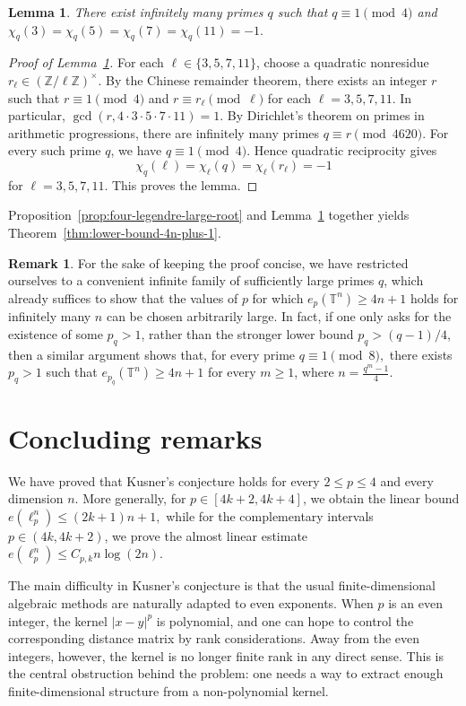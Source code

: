 \documentclass[11pt]{article}
\newtheorem{lemma}[theorem]{Lemma}
\theoremstyle{definition}
\newtheorem{rmk}[theorem]{Remark}
\newcommand{\T}{\mathbb T}
\begin{document}
\begin{lemma}\label{lem:infinitely-many-q-4n}
There exist infinitely many primes \(q\) such that
\(
q\equiv1\pmod4\)
and
\(
\chi_q(3)=\chi_q(5)=\chi_q(7)=\chi_q(11)=-1.
\)
\end{lemma}
\begin{proof}[Proof of Lemma~\ref{lem:infinitely-many-q-4n}]
    For each \(\ell\in\{3,5,7,11\}\), choose a quadratic nonresidue
\(
r_\ell\in(\mathbb Z/\ell\mathbb Z)^\times.
\)
By the Chinese remainder theorem, there exists an integer \(r\) such that
\(
r\equiv1\pmod4\)
and
\(
r\equiv r_\ell\pmod \ell\)
for each \(\ell=3,5,7,11.\)
In particular,
\(
\gcd(r,4\cdot3\cdot5\cdot7\cdot11)=1.
\)
By Dirichlet's theorem on primes in arithmetic progressions, there are
infinitely many primes
\(
q\equiv r\pmod{4620}.
\)
For every such prime \(q\), we have \(q\equiv1\pmod4\). Hence quadratic
reciprocity gives
\[
\chi_q(\ell)
=\chi_{\ell}(q)=\chi_{\ell}(r_\ell)=
-1
\]
for \(\ell=3,5,7,11.\) This proves the lemma.
\end{proof}
Proposition~\ref{prop:four-legendre-large-root} and Lemma~\ref{lem:infinitely-many-q-4n} together yields Theorem~\ref{thm:lower-bound-4n-plus-1}.

\begin{rmk}
	For the sake of keeping the proof concise, we have restricted ourselves to a convenient infinite family of sufficiently large primes \(q\), which already suffices to show that the values of \(p\) for which
	$e_p(\T^n)\ge 4n+1$
	holds for infinitely many \(n\) can be chosen arbitrarily large.
	In fact, if one only asks for the existence of some \(p_q>1\), rather than the stronger lower bound \(p_q>(q-1)/4\), then a similar argument shows that, for every prime
	$q\equiv 1\pmod 8,$
	there exists \(p_q>1\) such that
	$e_{p_q}(\T^n)\ge 4n+1$
	for every \(m\ge 1\), where
	$n=\frac{q^m-1}{4}.$
\end{rmk}

\section{Concluding remarks}

We have proved that Kusner's conjecture holds for every \(2\le p\le4\) and every
dimension \(n\). More generally, for \(p\in[4k+2,4k+4]\), we obtain the linear
bound
\(
e(\ell_p^n)\le (2k+1)n+1,
\)
while for the complementary intervals \(p\in(4k,4k+2)\),  we prove the
almost linear estimate
\(
e(\ell_p^n)\le C_{p,k}n\log(2n).
\)

The main difficulty in Kusner's conjecture is that the usual finite-dimensional
algebraic methods are naturally adapted to even exponents. When \(p\) is an even
integer, the kernel \(|x-y|^p\) is polynomial, and one can hope to control the
corresponding distance matrix by rank considerations. Away from the even
integers, however, the kernel is no longer finite rank in any direct sense. This
is the central obstruction behind the problem: one needs a way to extract enough
finite-dimensional structure from a non-polynomial kernel.
\end{document}
